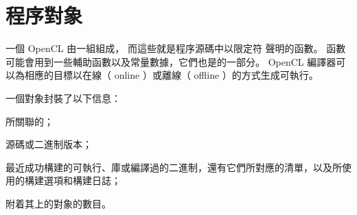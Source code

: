 \section{程序對象}

一個 OpenCL 由一組組成，
而這些就是程序源碼中以限定符  聲明的函數。
  函數可能會用到一些輔助函數以及常量數據，它們也是的一部分。
 OpenCL 編譯器可以為相應的目標以{\ftEmp 在線}（ {\ftEmp online} ）或{\ftEmp 離線}（ {\ftEmp offline} ）的方式生成可執行。

一個對象封裝了以下信息：
\startigBase
\item 所關聯的；
\item {}源碼或二進制版本；
\item 最近成功構建的可執行、庫或編譯過的二進制，還有它們所對應的清單，以及所使用的構建選項和構建日誌；
\item 附着其上的對象的數目。
\stopigBase



